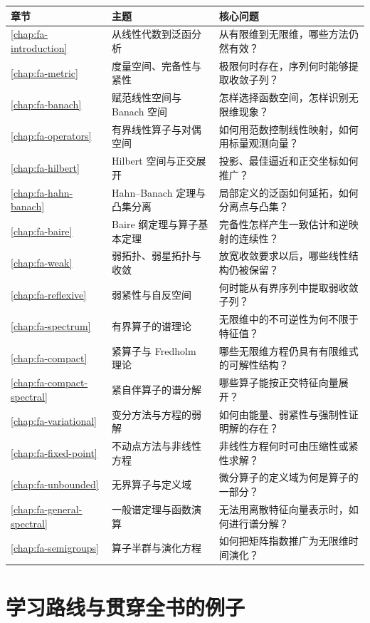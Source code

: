 \documentclass[UTF8,12pt,a4paper,fontset=fandol]{ctexbook}
\begin{document}
\begin{longtable}{L{0.08\textwidth}L{0.32\textwidth}L{0.48\textwidth}}
\toprule
章节 & 主题 & 核心问题 \\
\midrule
\endhead
\ref{chap:fa-introduction} & 从线性代数到泛函分析 & 从有限维到无限维，哪些方法仍然有效？ \\
\ref{chap:fa-metric} & 度量空间、完备性与紧性 & 极限何时存在，序列何时能够提取收敛子列？ \\
\ref{chap:fa-banach} & 赋范线性空间与 Banach 空间 & 怎样选择函数空间，怎样识别无限维现象？ \\
\ref{chap:fa-operators} & 有界线性算子与对偶空间 & 如何用范数控制线性映射，如何用标量观测向量？ \\
\ref{chap:fa-hilbert} & Hilbert 空间与正交展开 & 投影、最佳逼近和正交坐标如何推广？ \\
\ref{chap:fa-hahn-banach} & Hahn--Banach 定理与凸集分离 & 局部定义的泛函如何延拓，如何分离点与凸集？ \\
\ref{chap:fa-baire} & Baire 纲定理与算子基本定理 & 完备性怎样产生一致估计和逆映射的连续性？ \\
\ref{chap:fa-weak} & 弱拓扑、弱星拓扑与收敛 & 放宽收敛要求以后，哪些线性结构仍被保留？ \\
\ref{chap:fa-reflexive} & 弱紧性与自反空间 & 何时能从有界序列中提取弱收敛子列？ \\
\ref{chap:fa-spectrum} & 有界算子的谱理论 & 无限维中的不可逆性为何不限于特征值？ \\
\ref{chap:fa-compact} & 紧算子与 Fredholm 理论 & 哪些无限维方程仍具有有限维式的可解性结构？ \\
\ref{chap:fa-compact-spectral} & 紧自伴算子的谱分解 & 哪些算子能按正交特征向量展开？ \\
\ref{chap:fa-variational} & 变分方法与方程的弱解 & 如何由能量、弱紧性与强制性证明解的存在？ \\
\ref{chap:fa-fixed-point} & 不动点方法与非线性方程 & 非线性方程何时可由压缩性或紧性求解？ \\
\ref{chap:fa-unbounded} & 无界算子与定义域 & 微分算子的定义域为何是算子的一部分？ \\
\ref{chap:fa-general-spectral} & 一般谱定理与函数演算 & 无法用离散特征向量表示时，如何进行谱分解？ \\
\ref{chap:fa-semigroups} & 算子半群与演化方程 & 如何把矩阵指数推广为无限维时间演化？ \\
\bottomrule
\end{longtable}

\section{学习路线与贯穿全书的例子}
\end{document}
